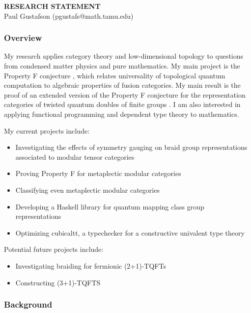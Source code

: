 \documentclass[12pt]{article}
\theoremstyle{plain} \numberwithin{equation}{section}
\theoremstyle{definition}
\begin{document}
\begin{center}
{\bf RESEARCH STATEMENT}\\
\vspace*{0.1cm}
{\normalsize Paul Gustafson (pgustafs@math.tamu.edu)}
\end{center}




\subsubsection*{Overview}

My research applies category theory and low-dimensional topology to questions from condensed matter physics and pure mathematics.   My main project is the Property F conjecture \cite{nr}, which relates universality of topological quantum computation to algebraic properties of fusion categories.  My main result is the proof of  an extended version of the Property F conjecture for the representation categories of twisted quantum doubles of finite groups \cite{g}. I am also interested in applying functional programming and dependent type theory to mathematics.  

My current projects include:
\begin{itemize}
\item Investigating the effects of symmetry gauging on braid group representations associated to modular tensor categories
\item Proving Property F for metaplectic modular categories
\item Classifying even metaplectic modular categories
\item Developing a Haskell library for quantum mapping class group representations
\item Optimizing cubicaltt, a typechecker for a constructive univalent type theory
\end{itemize}

Potential future projects include:
\begin{itemize}
  \item Investigating braiding for fermionic (2+1)-TQFTs
  \item Constructing (3+1)-TQFTS
\end{itemize}


\subsubsection*{Background}
\end{document}
